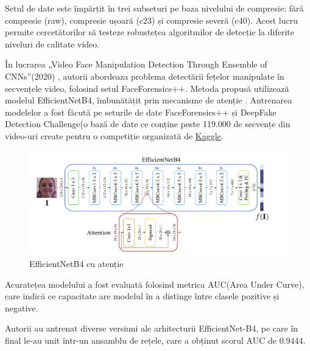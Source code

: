Setul de date este împărțit în trei subseturi pe baza nivelului de compresie: fără compresie (raw), compresie ușoară (c23) și compresie severă (c40). Acest lucru permite cercetătorilor să testeze robustețea algoritmilor de detecție la diferite niveluri de calitate video.

În lucrarea „Video Face Manipulation Detection Through Ensemble of CNNs”(2020) \cite{bonettini2020video}, autorii abordeaza problema detectării fețelor manipulate în secvențele video, folosind setul FaceForensics++.  Metoda propusă utilizează modelul EfficientNetB4\cite{tan2019efficientnet}, îmbunătățit prin mecanisme de atenție \cite{vaswani2017attention}. Antrenarea modelelor a fost făcută pe seturile de date FaceForensics++ și DeepFake Detection Challenge(o bază de date ce conține peste 119.000 de secvențe din video-uri create pentru o competiție organizată de \href{https://www.kaggle.com/}{Kaggle}. 

\begin{figure}[h]
     \centering 
     \includegraphics[width=\linewidth]{images/efficientnetb4.png}
     \captionsetup{font=footnotesize}
     \caption{EfficientNetB4 cu atenție \cite{bonettini2020video}}
\end{figure}

Acuratețea modelului a fost evaluată folosind metrica AUC(Area Under Curve), care indică ce capacitate are modelul în a distinge între clasele pozitive și negative.

Autorii au antrenat diverse versiuni ale arhitecturii EfficientNet-B4, pe care în final le-au unit într-un ansamblu de rețele, care a obținut scorul AUC de 0.9444. 

